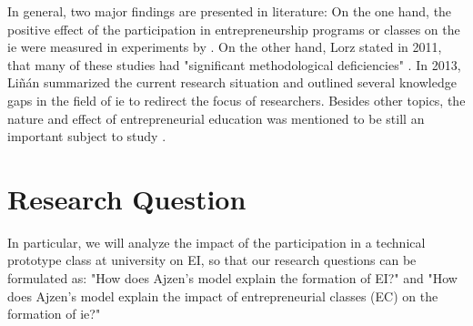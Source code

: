 In general, two major findings are presented in literature: On the one hand, the positive effect of the participation in entrepreneurship programs or classes on the \ac{ie} were measured in experiments by .
On the other hand, Lorz stated in 2011, that many of these studies had "significant methodological deficiencies" \cite{lorz2011impact}.
In 2013, Li{\~n}{\'a}n summarized the current research situation and outlined several knowledge gaps in the field of \ac{ie} to redirect the focus of researchers. Besides other topics, the nature and effect of entrepreneurial education was mentioned to be still an important subject to study \cite{linan2015systematic}. 



\section{Research Question}
In particular, we will analyze the impact of the participation in a technical prototype class at university on EI, so that our research questions can be formulated as: "How does Ajzen's model explain the formation of EI?" and "How does Ajzen's model explain the impact of entrepreneurial classes (EC) on the formation of \ac{ie}?"